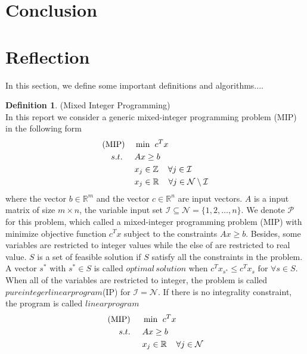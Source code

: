 \documentclass[11pt]{article}
\theoremstyle{definition}
\newtheorem{definition}{Definition}[section] %
\begin{document}
\section{Conclusion}

\section{Reflection}




In this section, we define some important definitions and algorithms....
\begin{definition}
(Mixed Integer Programming)\\
In this report we consider a generic mixed-integer programming problem (MIP) in the following form
	\begin{align*}
	\text{(MIP)} \hspace{4mm} &\min \hspace{1.5mm}c^Tx \\
	s.t.\hspace{5mm} &Ax \geq b \\
	&x_j \in \mathbb{Z} \hspace{4mm} \forall j \in \mathcal{I}\\
	&x_j \in \mathbb{R} \hspace{4mm} \forall j \in \mathcal{N} \setminus \mathcal{I}\\
	\end{align*}
where the vector $b \in \mathbb{R}^m$ and the vector $c \in \mathbb{R}^n$ are input vectors.   $A$ is a input matrix of size $m \times n$, the variable input set $\mathcal{I} \subseteq \mathcal{N} = \lbrace 1,2,\dots,n\rbrace$. We denote $\mathcal{P}$ for this problem, which called a mixed-integer programming problem (MIP) with minimize objective function $c^Tx$ subject to the constraints $Ax \geq b$. Besides, some variables are restricted to integer values while the else of are restricted to real value. $S$ is a set of feasible solution if $S$ satisfy all the constraints in the problem. A vector $s^*$ with $s^* \in  S $ is called $optimal \, solution$ when $c^Tx_{s^*} \leq c^Tx_{s} \text{ for } \forall s \in S$.
When all of the variables are restricted to integer, the problem is called $pure integer linear program$(IP) for $\mathcal{I} = \mathcal{N}$. If there is no  integrality constraint, the program is called $linear program$
	\begin{align*}
	\text{(MIP)} \hspace{5mm} &\min \hspace{1.5mm}c^Tx \\
	s.t.\hspace{5mm} &Ax \geq b \\
	&x_j \in \mathbb{R} \hspace{4mm} \forall j \in \mathcal{N} \\
	\end{align*}

\label{def_MIP}
\end{definition}
\end{document}
